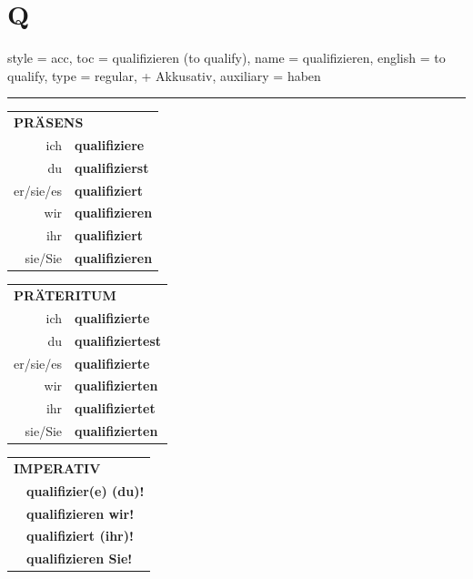 \section{Q}

\begin{verbentry}{
  style = {acc},
  toc = {qualifizieren (to qualify)},
  name = {qualifizieren},
  english = {to qualify},
  type = {regular, + Akkusativ},
  auxiliary = {haben}
}


\vspace{5pt}
\hrule
\vspace{5pt}

\begin{tabular}{rl}
\multicolumn{2}{l}{\textbf{PRÄSENS}}\\
ich & \textbf{qualifiziere}\\
du & \textbf{qualifizierst}\\
er/sie/es & \textbf{qualifiziert}\\
wir & \textbf{qualifizieren}\\
ihr & \textbf{qualifiziert}\\
sie/Sie & \textbf{qualifizieren}\\
\end{tabular}
\hfill
\begin{tabular}{rl}
\multicolumn{2}{l}{\textbf{PRÄTERITUM}}\\
ich & \textbf{qualifizierte}\\
du & \textbf{qualifiziertest}\\
er/sie/es & \textbf{qualifizierte}\\
wir & \textbf{qualifizierten}\\
ihr & \textbf{qualifiziertet}\\
sie/Sie & \textbf{qualifizierten}\\
\end{tabular}
\hfill
\begin{tabular}{rl}
\multicolumn{2}{l}{\textbf{IMPERATIV}}\\
& \textbf{qualifizier(e) (du)!}\\
& \textbf{qualifizieren wir!}\\
& \textbf{qualifiziert (ihr)!}\\
& \textbf{qualifizieren Sie!}\\
\end{tabular}

\vspace{10pt}


\end{verbentry}
